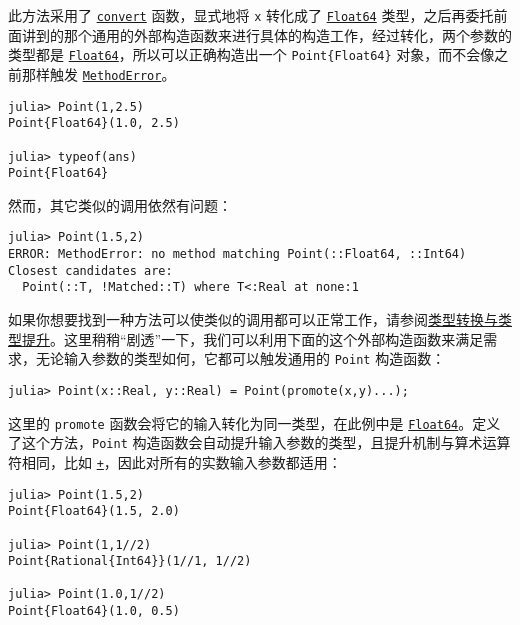 此方法采用了 \hyperlink{1846942650946171605}{\texttt{convert}} 函数，显式地将 \texttt{x} 转化成了 \hyperlink{5027751419500983000}{\texttt{Float64}} 类型，之后再委托前面讲到的那个通用的外部构造函数来进行具体的构造工作，经过转化，两个参数的类型都是 \hyperlink{5027751419500983000}{\texttt{Float64}}，所以可以正确构造出一个 \texttt{Point\{Float64\}} 对象，而不会像之前那样触发 \hyperlink{68769522931907606}{\texttt{MethodError}}。




\begin{verbatim}
julia> Point(1,2.5)
Point{Float64}(1.0, 2.5)

julia> typeof(ans)
Point{Float64}
\end{verbatim}



然而，其它类似的调用依然有问题：




\begin{verbatim}
julia> Point(1.5,2)
ERROR: MethodError: no method matching Point(::Float64, ::Int64)
Closest candidates are:
  Point(::T, !Matched::T) where T<:Real at none:1
\end{verbatim}



如果你想要找到一种方法可以使类似的调用都可以正常工作，请参阅\hyperlink{10374023657104680331}{类型转换与类型提升}。这里稍稍“剧透”一下，我们可以利用下面的这个外部构造函数来满足需求，无论输入参数的类型如何，它都可以触发通用的 \texttt{Point} 构造函数：




\begin{verbatim}
julia> Point(x::Real, y::Real) = Point(promote(x,y)...);
\end{verbatim}



这里的 \texttt{promote} 函数会将它的输入转化为同一类型，在此例中是 \hyperlink{5027751419500983000}{\texttt{Float64}}。定义了这个方法，\texttt{Point} 构造函数会自动提升输入参数的类型，且提升机制与算术运算符相同，比如 \hyperlink{3677358729494553841}{\texttt{+}}，因此对所有的实数输入参数都适用：




\begin{verbatim}
julia> Point(1.5,2)
Point{Float64}(1.5, 2.0)

julia> Point(1,1//2)
Point{Rational{Int64}}(1//1, 1//2)

julia> Point(1.0,1//2)
Point{Float64}(1.0, 0.5)
\end{verbatim}




